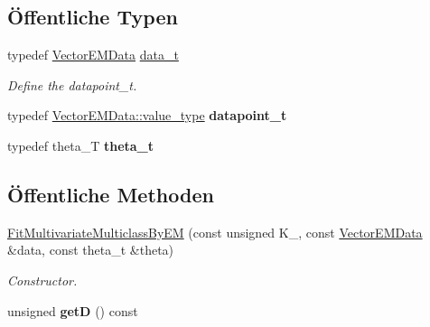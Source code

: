 \subsection*{Öffentliche Typen}
\begin{DoxyCompactItemize}
\item 
\hypertarget{classCDA_1_1FitMultivariateMulticlassByEM_a7831e85cafbf2f27c8944c9db1e4c4bf}{
typedef \hyperlink{classCDA_1_1VectorEMData}{VectorEMData} \hyperlink{classCDA_1_1FitMultivariateMulticlassByEM_a7831e85cafbf2f27c8944c9db1e4c4bf}{data\_\-t}}
\label{classCDA_1_1FitMultivariateMulticlassByEM_a7831e85cafbf2f27c8944c9db1e4c4bf}

\begin{DoxyCompactList}\small\item\em Define the datapoint\_\-t. \item\end{DoxyCompactList}\item 
\hypertarget{classCDA_1_1FitMultivariateMulticlassByEM_a25d1211b30d3b411a0116b8efd66efdf}{
typedef \hyperlink{classCDA_1_1EMData_a010a85bcffac375b7b0d9dfbc0ed2626}{VectorEMData::value\_\-type} {\bfseries datapoint\_\-t}}
\label{classCDA_1_1FitMultivariateMulticlassByEM_a25d1211b30d3b411a0116b8efd66efdf}

\item 
\hypertarget{classCDA_1_1FitMultivariateMulticlassByEM_afc08a4f0e2d114eefa4ac5e5894e78aa}{
typedef theta\_\-T {\bfseries theta\_\-t}}
\label{classCDA_1_1FitMultivariateMulticlassByEM_afc08a4f0e2d114eefa4ac5e5894e78aa}

\end{DoxyCompactItemize}
\subsection*{Öffentliche Methoden}
\begin{DoxyCompactItemize}
\item 
\hyperlink{classCDA_1_1FitMultivariateMulticlassByEM_ab16e1e3d2592e52801d7ebe94fb8b8d3}{FitMultivariateMulticlassByEM} (const unsigned K\_\-, const \hyperlink{classCDA_1_1VectorEMData}{VectorEMData} \&data, const theta\_\-t \&theta)
\begin{DoxyCompactList}\small\item\em Constructor. \item\end{DoxyCompactList}\item 
\hypertarget{classCDA_1_1FitMultivariateMulticlassByEM_a61354d086a158b075beccd1a956eb1f8}{
unsigned {\bfseries getD} () const }
\label{classCDA_1_1FitMultivariateMulticlassByEM_a61354d086a158b075beccd1a956eb1f8}

\end{DoxyCompactItemize}


